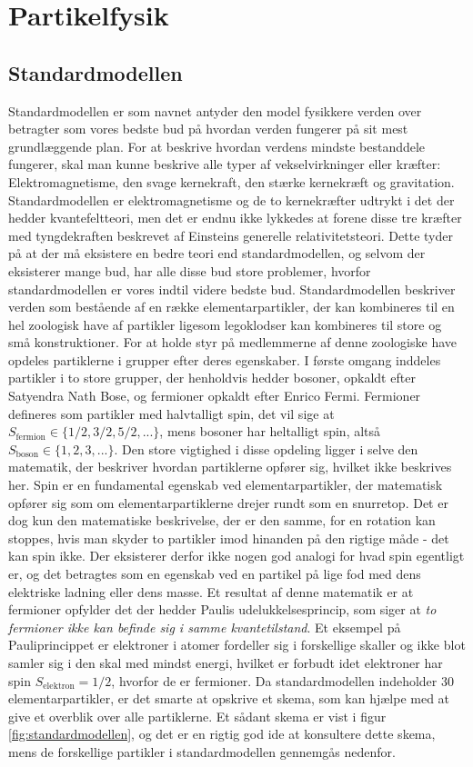 \chapter{Partikelfysik}

\section{Standardmodellen}
Standardmodellen er som navnet antyder den model fysikkere verden over betragter som vores bedste bud på hvordan verden fungerer på sit mest grundlæggende plan. For at beskrive hvordan verdens mindste bestanddele fungerer, skal man kunne beskrive alle typer af vekselvirkninger eller kræfter: Elektromagnetisme, den svage kernekraft, den stærke kernekræft og gravitation. Standardmodellen er elektromagnetisme og de to kernekræfter udtrykt i det der hedder kvantefeltteori, men det er endnu ikke lykkedes at forene disse tre kræfter med tyngdekraften beskrevet af Einsteins generelle relativitetsteori. Dette tyder på at der må eksistere en bedre teori end standardmodellen, og selvom der eksisterer mange bud, har alle disse bud store problemer, hvorfor standardmodellen er vores indtil videre bedste bud. Standardmodellen beskriver verden som bestående af en række elementarpartikler, der kan kombineres til en hel zoologisk have af partikler ligesom legoklodser kan kombineres til store og små konstruktioner. For at holde styr på medlemmerne af denne zoologiske have opdeles partiklerne i grupper efter deres egenskaber. I første omgang inddeles partikler i to store grupper, der henholdvis hedder bosoner, opkaldt efter Satyendra Nath Bose, og fermioner opkaldt efter Enrico Fermi. Fermioner defineres som partikler med halvtalligt spin, det vil sige at $S_\mathrm{fermion} \in \{1/2,3/2,5/2,...\}$, mens bosoner har heltalligt spin, altså $S_\mathrm{boson} \in \{1,2,3,...\}$. Den store vigtighed i disse opdeling ligger i selve den matematik, der beskriver hvordan partiklerne opfører sig, hvilket ikke beskrives her. Spin er en fundamental egenskab ved elementarpartikler, der matematisk opfører sig som om elementarpartiklerne drejer rundt som en snurretop. Det er dog kun den matematiske beskrivelse, der er den samme, for en rotation kan stoppes, hvis man skyder to partikler imod hinanden på den rigtige måde - det kan spin ikke. Der eksisterer derfor ikke nogen god analogi for hvad spin egentligt er, og det betragtes som en egenskab ved en partikel på lige fod med dens elektriske ladning eller dens masse. Et resultat af denne matematik er at fermioner opfylder det der hedder Paulis udelukkelsesprincip, som siger at \emph{to fermioner ikke kan befinde sig i samme kvantetilstand}. Et eksempel på Pauliprincippet er elektroner i atomer fordeller sig i forskellige skaller og ikke blot samler sig i den skal med mindst energi, hvilket er forbudt idet elektroner har spin $S_\mathrm{elektron} = 1/2$, hvorfor de er fermioner. Da standardmodellen indeholder 30 elementarpartikler, er det smarte at opskrive et skema, som kan hjælpe med at give et overblik over alle partiklerne. Et sådant skema er vist i figur \ref{fig:standardmodellen}, og det er en rigtig god ide at konsultere dette skema, mens de forskellige partikler i standardmodellen gennemgås nedenfor.

